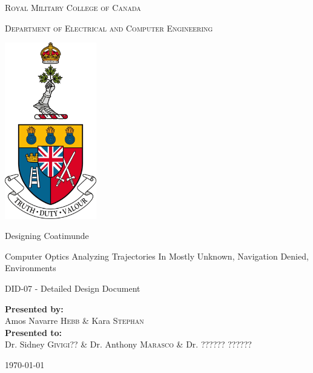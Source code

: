 \documentclass{article}
\begin{document}
	
\begin{titlepage}
	\begin{center}
		\vspace*{1cm}
		
		\LARGE\textsc{Royal Military College of Canada}\normalsize
		
		\vspace{0.2cm}
		
		\textsc{Department of Electrical and Computer Engineering}
		
		\vspace{1.5cm}
		
		\includegraphics[width=0.3\textwidth]{rmcLogo.png}
		
		\vspace{1.5cm}
		
		\LARGE{Designing Coatimunde\\}
		
		\vspace{0.2cm}
		
		\normalsize{Computer Optics Analyzing Trajectories In Mostly Unknown, Navigation Denied, Environments}
		
		\vspace{0.1cm}
		
		\normalsize{DID-07 - Detailed Design Document}
		
		\vfill
		
		\textbf{Presented by:}\\Amos Navarre \textsc{Hebb} \& Kara \textsc{Stephan}\\
		\vspace{0.8cm}
		\textbf{Presented to:}\\Dr. Sidney \textsc{Givigi??} \& Dr. Anthony \textsc{Marasco} \& Dr. ?????? \textsc{??????} 
		\vspace{0.8cm}
		
		\today
		
	\end{center}
\end{titlepage}
\end{document}
